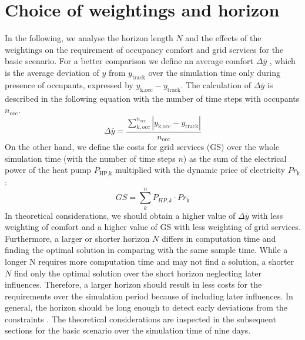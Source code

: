 \section{Choice of weightings and horizon}
\label{Choise of weigtings and horizon}
In the following, we analyse the horizon length $N$  and the effects of the weightings on the requirement of occupancy comfort and grid services for the basic scenario. For a better comparison we define an average comfort $\Delta \overline{y}$ , which is the average deviation of $y$ from $y_\text{track}$ over the simulation time only during presence of occupants, expressed by $y_\text{k,occ} - y_\text{track}$. The calculation of $\Delta \overline{y}$ is described in the following equation with the number of time steps with occupants $n_\text{occ}$.
\begin{equation}
    \label{eq:average comfort}
    \Delta \overline{y} = \frac{\sum_{k,occ}^{n_\text{occ}} |y_\text{k,occ} - y_\text{track}|}{n_\text{occ}}
\end{equation}
On the other hand, we define the costs for grid services (GS)  over the whole simulation time (with the number of time steps $n$) as the sum of the electrical power of the heat pump $P_\text{HP,k}$ multiplied with the dynamic price of electricity $Pr_\text{k}$:
\begin{equation}
\label{eq:GridService123}
    GS = \sum_{k}^n P_{HP,k}\cdot Pr_\text{k}
\end{equation}
In theoretical considerations, we should obtain a higher value of $\Delta \overline{y}$ with less weighting of comfort and a higher value of GS with less weighting of grid services. Furthermore, a larger or shorter horizon $N$ differs in computation time and finding the optimal solution in comparing with the same sample time. While a longer N requires more computation time and may not find a solution, a shorter $N$ find only the optimal solution over the short horizon neglecting later influences. Therefore, a larger horizon should result in less costs for the requirements over the simulation period because of including later influences. In general, the horizon should be long enough to detect early deviations from the constraints \cite{Dittmar.2019}. \newline
The theoretical considerations are inspected in the subsequent sections for the basic scenario over the simulation time of nine days.   

